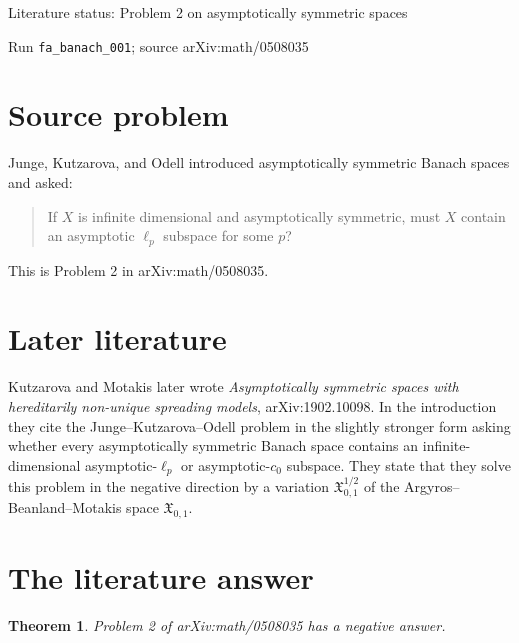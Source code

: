 \documentclass[11pt]{article}
\newtheorem{theorem}{Theorem}
\newcommand{\as}{asymptotically symmetric}
\newcommand{\ellp}{\ell_p}
\newcommand{\cnull}{c_0}
\newcommand{\Xkm}{\mathfrak{X}^{1/2}_{0,1}}
\begin{document}
\begin{center}
{\Large Literature status: Problem 2 on asymptotically symmetric spaces}

\medskip
{\small Run \texttt{fa\_banach\_001}; source arXiv:math/0508035}
\end{center}

\section*{Source problem}

Junge, Kutzarova, and Odell introduced asymptotically symmetric Banach spaces
and asked:
\begin{quote}
If \(X\) is infinite dimensional and asymptotically symmetric, must \(X\)
contain an asymptotic \(\ellp\) subspace for some \(p\)?
\end{quote}
This is Problem 2 in arXiv:math/0508035.

\section*{Later literature}

Kutzarova and Motakis later wrote \emph{Asymptotically symmetric spaces with
hereditarily non-unique spreading models}, arXiv:1902.10098.  In the
introduction they cite the Junge--Kutzarova--Odell problem in the slightly
stronger form asking whether every \as{} Banach space contains an
infinite-dimensional asymptotic-\(\ellp\) or asymptotic-\(\cnull\) subspace.
They state that they solve this problem in the negative direction by a
variation \(\Xkm\) of the Argyros--Beanland--Motakis space
\(\mathfrak{X}_{0,1}\).

\section*{The literature answer}

\begin{theorem}
Problem 2 of arXiv:math/0508035 has a negative answer.
\end{theorem}
\end{document}
